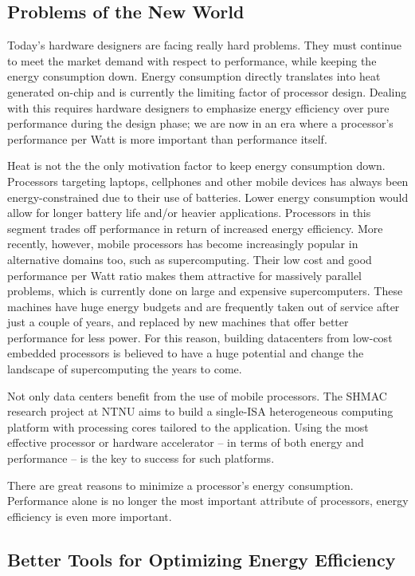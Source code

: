 \subsection{Problems of the New World}

Today's hardware designers are facing really hard problems. They must continue
to meet the market demand with respect to performance, while keeping the energy
consumption down. Energy consumption directly translates into heat generated
on-chip and is currently the limiting factor of processor design. Dealing with
this requires hardware designers to emphasize energy efficiency over pure
performance during the design phase; we are now in an era where a processor's
performance per Watt is more important than performance itself.

Heat is not the the only motivation factor to keep energy consumption down.
Processors targeting laptops, cellphones and other mobile devices has always
been energy-constrained due to their use of batteries. Lower energy consumption
would allow for longer battery life and/or heavier applications. Processors in
this segment trades off performance in return of increased energy efficiency.
More recently, however, mobile processors has become increasingly popular in
alternative domains too, such as supercomputing. Their low cost and good
performance per Watt ratio makes them attractive for massively parallel
problems, which is currently done on large and expensive supercomputers. These
machines have huge energy budgets and are frequently taken out of service after
just a couple of years, and replaced by new machines that offer better
performance for less power. For this reason, building datacenters from low-cost
embedded processors is believed to have a huge potential and change the
landscape of supercomputing the years to come.

Not only data centers benefit from the use of mobile processors. The SHMAC
research project at NTNU aims to build a single-ISA heterogeneous computing
platform with processing cores tailored to the application. Using the most
effective processor or hardware accelerator -- in terms of both energy
and performance -- is the key to success for such platforms.

There are great reasons to minimize a processor's energy consumption.
Performance alone is no longer the most important attribute of processors,
energy efficiency is even more important.


\subsection{Better Tools for Optimizing Energy Efficiency}


